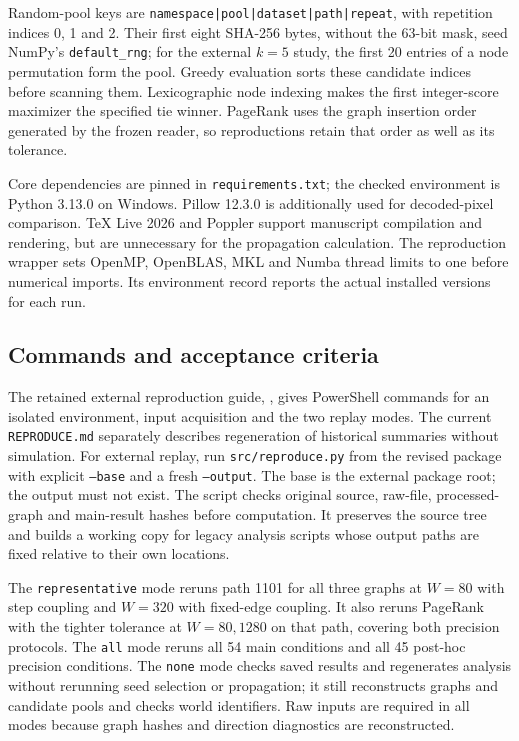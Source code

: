 \documentclass[smallextended]{svjour3}
\begin{document}
Random-pool keys are \texttt{namespace|pool|dataset|path|repeat}, with repetition
indices 0, 1 and 2. Their first eight SHA-256 bytes, without the 63-bit mask,
seed NumPy's \texttt{default\_rng}; for the external $k=5$ study, the first 20 entries of a node permutation
form the pool. Greedy evaluation sorts these candidate indices before scanning
them. Lexicographic node indexing makes the first integer-score maximizer the
specified tie winner. PageRank uses the graph insertion order generated by
the frozen reader, so reproductions retain that order as well as its tolerance.

Core dependencies are pinned in \texttt{requirements.txt}; the checked environment
is Python 3.13.0 on Windows. Pillow 12.3.0 is additionally used for decoded-pixel
comparison. TeX Live 2026 and Poppler support manuscript compilation and rendering,
but are unnecessary for the propagation calculation. The reproduction wrapper
sets OpenMP, OpenBLAS, MKL and Numba thread limits to one before numerical imports.
Its environment record reports the actual installed versions for each run.

\subsection{Commands and acceptance criteria}
The retained external reproduction guide, ,
gives PowerShell commands for an isolated environment, input acquisition and
the two replay modes. The current \texttt{REPRODUCE.md} separately describes
regeneration of historical summaries without simulation. For external replay, run
\texttt{src/reproduce.py} from the revised package with explicit
\texttt{--base} and a fresh \texttt{--output}. The base is the external package
root; the output must not exist. The script checks original source, raw-file,
processed-graph and main-result hashes before computation. It preserves the
source tree and builds a working copy for legacy analysis scripts whose output
paths are fixed relative to their own locations.

The \texttt{representative} mode reruns path 1101 for all three graphs at
$W=80$ with step coupling and $W=320$ with fixed-edge coupling. It also reruns
PageRank with the tighter tolerance at $W=80,1280$ on that path, covering both precision protocols.
The \texttt{all} mode reruns all 54 main conditions and all 45 post-hoc
precision conditions. The \texttt{none} mode checks saved results and regenerates
analysis without rerunning seed selection or propagation; it still reconstructs
graphs and candidate pools and checks world identifiers. Raw inputs are required in all modes
because graph hashes and direction diagnostics are reconstructed.
\end{document}
